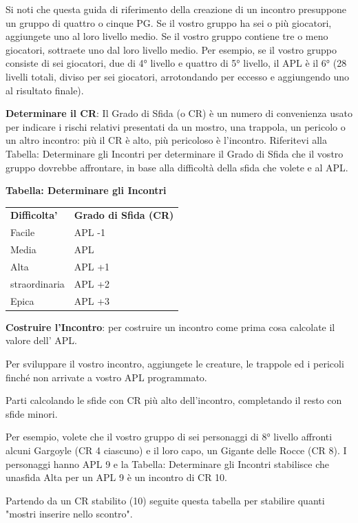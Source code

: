 \documentclass[a4paper,11pt,twoside,openany]{book}
\begin{document}
Si noti che questa guida di riferimento della creazione di un incontro presuppone un gruppo di quattro o cinque PG. Se il vostro gruppo ha sei o più giocatori, aggiungete uno al loro livello medio. Se il vostro gruppo contiene tre o meno giocatori, sottraete uno dal loro livello medio. Per esempio, se il vostro gruppo consiste di sei giocatori, due di 4° livello e quattro di 5° livello, il APL è il 6° (28 livelli totali, diviso per sei giocatori, arrotondando per eccesso e aggiungendo uno al risultato finale).

\textbf{Determinare il CR}: Il Grado di Sfida (o CR) è un numero di convenienza usato per indicare i rischi relativi presentati da un mostro, una trappola, un pericolo o un altro incontro: più il CR è alto, più pericoloso è l'incontro. Riferitevi alla Tabella: Determinare gli Incontri per determinare il Grado di Sfida che il vostro gruppo dovrebbe affrontare, in base alla difficoltà della sfida che volete e al APL.

\bigskip

\textbf{Tabella: Determinare gli Incontri}

\begin{tabular}{ll}
	\toprule
	\textbf{Difficolta'} & \textbf{Grado di Sfida (CR)}\tabularnewline
	Facile               & APL -1\tabularnewline
	Media                & APL\tabularnewline
	Alta                 & APL +1\tabularnewline
	straordinaria        & APL +2\tabularnewline
	Epica                & APL +3\tabularnewline
\end{tabular}

\bigskip

\textbf{Costruire l'Incontro}: per costruire un incontro come prima cosa calcolate il valore dell' APL.

Per sviluppare il vostro incontro, aggiungete le creature, le trappole ed i pericoli finché non arrivate a vostro APL programmato.

Parti calcolando le sfide con CR più alto dell'incontro, completando il resto con sfide minori.

Per esempio, volete che il vostro gruppo di sei personaggi di 8° livello affronti alcuni Gargoyle (CR 4 ciascuno) e il loro capo, un Gigante delle Rocce (CR 8). I personaggi hanno APL 9 e la Tabella: Determinare gli Incontri stabilisce che unasfida Alta per un APL 9 è un incontro di CR 10.

Partendo da un CR stabilito (10) seguite questa tabella per stabilire quanti "mostri inserire nello scontro".

\bigskip
\end{document}
